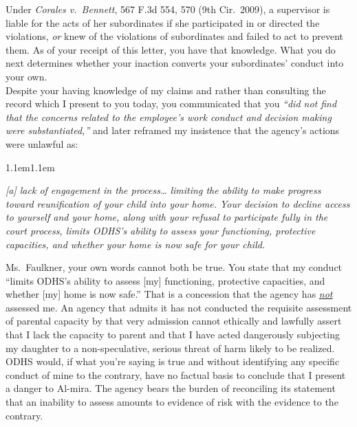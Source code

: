 \documentclass[10pt,a4paper,roman]{moderncv}
\renewenvironment{quote}{%
	\par\smallskip{\color{inkblue}\rule{\linewidth}{0.7pt}}\par\vspace{6pt}%
	\leftskip1.1em\rightskip1.1em\itshape\color{inkblue!92!black}%
}{%
	\par\vspace{6pt}{\color{inkblue}\rule{\linewidth}{0.7pt}}\par\smallskip%
}
\begin{document}
\begin{enumerate}[leftmargin=*,itemsep=0.35em,topsep=0.3em,resume]
Under \emph{Corales v.~Bennett}, 567 F.3d 554, 570 (9th Cir.~2009), a supervisor is liable for the acts of her subordinates if she participated in or directed the violations, \emph{or} knew of the violations of subordinates and failed to act to prevent them. As of your receipt of this letter, you have that knowledge. What you do next determines whether your inaction converts your subordinates' conduct into your own.\\

Despite your having knowledge of my claims and rather than consulting the record which I present to you today, you communicated that you \emph{``did not find that the concerns related to the employee's work conduct and decision making were substantiated,''} and later reframed my insistence that the agency's actions were unlawful as:

\begin{center}
	\begin{minipage}{0.80\textwidth}
		\begin{quote}
			\textit{[a] lack of engagement in the process\ldots{} limiting the ability
				to make progress toward reunification of your child into your home. Your
				decision to decline access to yourself and your home, along with your
				refusal to participate fully in the court process, limits ODHS's ability
				to assess your functioning, protective capacities, and whether your home
				is now safe for your child.}
		\end{quote}
	\end{minipage}
\end{center}

Ms.~Faulkner, your own words cannot both be true. You state that my conduct ``limits ODHS's ability to assess [my] functioning, protective capacities, and	whether [my] home is now safe.'' That is a concession that the agency has \emph{\underline{not}} assessed me. An agency that admits it has not conducted the requisite assessment of parental capacity by that very admission cannot ethically and lawfully assert that I lack the capacity to parent and that I have acted dangerously subjecting my daughter to a non-speculative, serious threat of harm likely to be realized. ODHS would, if what you're saying is true and without identifying any specific conduct of mine to the contrary, have no factual basis to conclude that I present a danger to Al-mira. The agency bears the burden of reconciling its statement that an inability to assess amounts to evidence of risk with the evidence to the contrary.\\


\end{enumerate}
\end{document}
